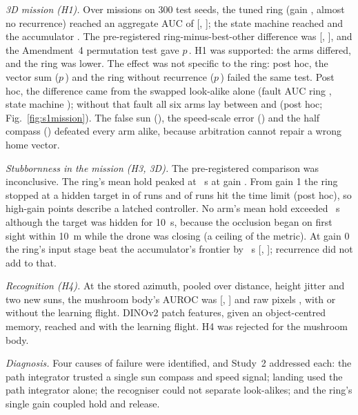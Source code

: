 \documentclass[10pt,twocolumn]{article}
\begin{document}
\emph{3D mission (H1).} Over \SoneNmissions{} missions on 300 test seeds, the tuned ring (gain \SoneThreeDGain, almost no recurrence) reached an aggregate AUC of \SoneAUCRing{} [\SoneAUCRingLo, \SoneAUCRingHi]; the state machine reached \SoneAUCSM{} and the accumulator \SoneAUCAcc. The pre-registered ring-minus-best-other difference was \SoneHoneDiff{} [\SoneHoneDiffLo, \SoneHoneDiffHi], and the Amendment~4 permutation test gave $p$\,\SoneHonePermP. H1 was supported: the arms differed, and the ring was lower. The effect was not specific to the ring: post hoc, the vector sum ($p$\,\SoneHoneSumP) and the ring without recurrence ($p$\,\SoneHoneStaticP) failed the same test. Post hoc, the difference came from the swapped look-alike alone (fault AUC ring \SoneDecoyRing, state machine \SoneDecoySM); without that fault all six arms lay between \SoneNoDecoyLo{} and \SoneNoDecoyHi{} (post hoc; Fig.~\ref{fig:s1mission}). The false sun (\SoneFalseSun), the speed-scale error (\SoneSpeed) and the half compass (\SoneCompass) defeated every arm alike, because arbitration cannot repair a wrong home vector.


\emph{Stubbornness in the mission (H3, 3D).} The pre-registered comparison was inconclusive. The ring's mean hold peaked at \SoneHthreePeak{}~s at gain \SoneHthreePeakGain. From gain 1 the ring stopped at a hidden target in \SoneHthreeStopGone{} of runs and \SoneHthreeLimitGone{} of runs hit the time limit (post hoc), so high-gain points describe a latched controller. No arm's mean hold exceeded \SoneHthreeCeil{}~s although the target was hidden for 10~s, because the occlusion began on first sight within 10~m while the drone was closing (a ceiling of the metric). At gain 0 the ring's input stage beat the accumulator's frontier by \SoneHthreeAccGzero{}~s [\SoneHthreeAccGzeroLo, \SoneHthreeAccGzeroHi]; recurrence did not add to that.

\emph{Recognition (H4).} At the stored azimuth, pooled over distance, height jitter and two new suns, the mushroom body's AUROC was \SoneMB{} [\SoneMBLo, \SoneMBHi] and raw pixels \SonePix, with or without the learning flight. DINOv2 patch features, given an object-centred memory, reached \SoneDinoOff{} and \SoneDinoOn{} with the learning flight. H4 was rejected for the mushroom body.

\emph{Diagnosis.} Four causes of failure were identified, and Study~2 addressed each: the path integrator trusted a single sun compass and speed signal; landing used the path integrator alone; the recogniser could not separate look-alikes; and the ring's single gain coupled hold and release.
\end{document}
